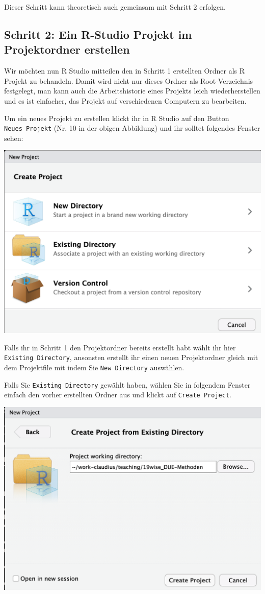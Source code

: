 \documentclass[]{tufte-book}
\begin{document}
Dieser Schritt kann theoretisch auch gemeinsam mit Schritt 2 erfolgen.

\subsection{Schritt 2: Ein R-Studio Projekt im Projektordner
erstellen}\label{schritt-2-ein-r-studio-projekt-im-projektordner-erstellen}

Wir möchten nun R Studio mitteilen den in Schritt 1 erstellten Ordner
als R Projekt zu behandeln. Damit wird nicht nur dieses Ordner als
Root-Verzeichnis festgelegt, man kann auch die Arbeitshistorie eines
Projekts leich wiederherstellen und es ist einfacher, das Projekt auf
verschiedenen Computern zu bearbeiten.

Um ein neues Projekt zu erstellen klickt ihr in R Studio auf den Button
\texttt{Neues\ Projekt} (Nr. 10 in der obigen Abbildung) und ihr solltet
folgendes Fenster sehen:

\begin{center}\includegraphics[width=0.6\linewidth]{figures/r-studio-new-project} \end{center}

Falls ihr in Schritt 1 den Projektordner bereits erstellt habt wählt ihr
hier \texttt{Existing\ Directory}, ansonsten erstellt ihr einen neuen
Projektordner gleich mit dem Projektfile mit indem Sie
\texttt{New\ Directory} auswählen.

Falls Sie \texttt{Existing\ Directory} gewählt haben, wählen Sie in
folgendem Fenster einfach den vorher erstellten Ordner aus und klickt
auf \texttt{Create\ Project}.

\begin{center}\includegraphics[width=0.6\linewidth]{figures/r-studio-new-project-exis-dir} \end{center}
\end{document}
